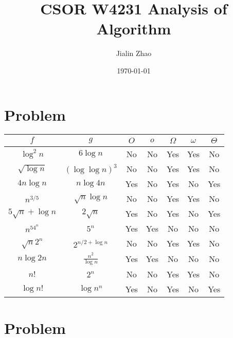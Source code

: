 \documentclass{article}
\title{CSOR W4231 Analysis of Algorithm}
\author{Jialin Zhao}
\date{\today}
\begin{document}
 
\maketitle{} 
\section{Problem \uppercase\expandafter{}} 
\begin{table}[!hbp]
\LARGE
\begin{center}
\begin{tabular}{*{7}{|c}|}

\hline $\mathit{f}$&$\mathit{g}$&$\mathit{O}$&$\mathit{o}$&$\Omega$&$\omega$&$\Theta$\\
\hline $\log^2n$&$6\log n$&No&No&Yes&Yes&No\\
\hline $\sqrt{\log n}$&$(\log \log n )^3$&No&No&Yes&Yes&No\\
\hline $4n\log n$&$n\log 4n$&Yes&No&Yes&No&Yes\\
\hline $n^{3/5}$&$\sqrt{n}\log n$&No&No&Yes&Yes&No\\
\hline $5\sqrt{n}+\log n$&$2\sqrt{n}$&Yes&No&Yes&No&Yes \\
\hline $n^54^n$&$5^n$&Yes&Yes&No&No&No\\
\hline $\sqrt{n}2^n$&$2^{n/2+\log n}$&No&No&Yes&Yes&No\\
\hline $n\log 2n$&$\frac{n^2}{\log n}$&Yes&Yes&No&No&No\\
\hline $n!$&$2^n$&No&No&Yes&Yes&No\\
\hline $\log n!$&$\log n^n$&Yes&No&Yes&No&Yes\\
\hline
\end{tabular}
\end{center}
\end{table}

\section{Problem \uppercase\expandafter{}}
\end{document}
